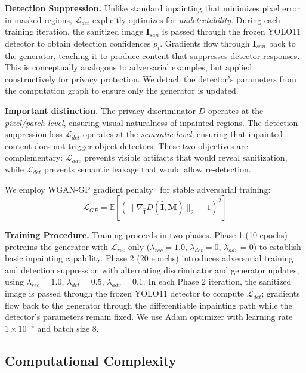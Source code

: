 \documentclass[preprint,12pt]{elsarticle}
\begin{document}
\textbf{Detection Suppression.} Unlike standard inpainting that minimizes pixel error in masked regions, $\mathcal{L}_{det}$ explicitly optimizes for \emph{undetectability}. During each training iteration, the sanitized image $\mathbf{I}_{san}$ is passed through the frozen YOLO11 detector to obtain detection confidences $p_i$. Gradients flow through $\mathbf{I}_{san}$ back to the generator, teaching it to produce content that suppresses detector responses. This is conceptually analogous to adversarial examples, but applied constructively for privacy protection. We detach the detector's parameters from the computation graph to ensure only the generator is updated.

\textbf{Important distinction.} The privacy discriminator $D$ operates at the \emph{pixel/patch level}, ensuring visual naturalness of inpainted regions. The detection suppression loss $\mathcal{L}_{det}$ operates at the \emph{semantic level}, ensuring that inpainted content does not trigger object detectors. These two objectives are complementary: $\mathcal{L}_{adv}$ prevents visible artifacts that would reveal sanitization, while $\mathcal{L}_{det}$ prevents semantic leakage that would allow re-detection.

We employ WGAN-GP gradient penalty~\cite{gulrajani2017improved} for stable adversarial training:
\begin{equation}
\mathcal{L}_{GP} = \mathbb{E}\left[(\|\nabla_{\hat{\mathbf{I}}} D(\hat{\mathbf{I}}, \mathbf{M})\|_2 - 1)^2\right]
\end{equation}

\textbf{Training Procedure.} Training proceeds in two phases. Phase 1 (10 epochs) pretrains the generator with $\mathcal{L}_{rec}$ only ($\lambda_{rec}=1.0$, $\lambda_{det}=0$, $\lambda_{adv}=0$) to establish basic inpainting capability. Phase 2 (20 epochs) introduces adversarial training and detection suppression with alternating discriminator and generator updates, using $\lambda_{rec}=1.0$, $\lambda_{det}=0.5$, $\lambda_{adv}=0.1$. In each Phase 2 iteration, the sanitized image is passed through the frozen YOLO11 detector to compute $\mathcal{L}_{det}$; gradients flow back to the generator through the differentiable inpainting path while the detector's parameters remain fixed. We use Adam optimizer with learning rate $1 \times 10^{-4}$ and batch size 8.

\subsection{Computational Complexity}
\end{document}
